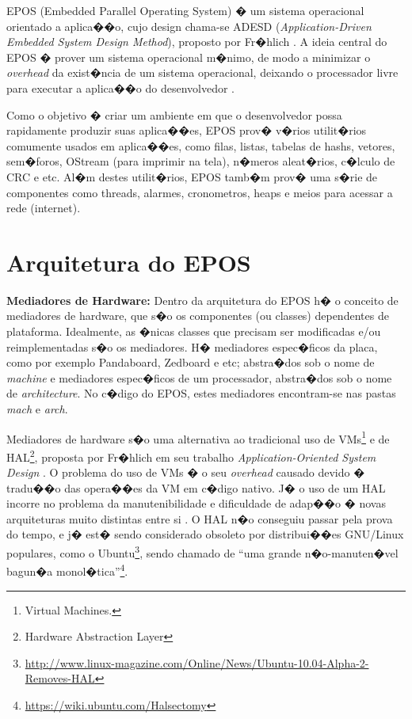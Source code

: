 \documentclass{ufscThesis/ufscThesis} %
\begin{document}
EPOS (Embedded Parallel Operating System) � um sistema operacional orientado a aplica��o, cujo design chama-se ADESD (\emph{Application-Driven Embedded System Design Method}), proposto por Fr�hlich \cite{guto_thesis}. A ideia central do EPOS � prover um sistema operacional m�nimo, de modo a minimizar o \emph{overhead} da exist�ncia de um sistema operacional, deixando o processador livre para executar a aplica��o do desenvolvedor \cite{epos_user_guide}.

Como o objetivo � criar um ambiente em que o desenvolvedor possa rapidamente produzir suas aplica��es, EPOS prov� v�rios utilit�rios comumente usados em aplica��es, como filas, listas, tabelas de hashs, vetores, sem�foros, OStream (para imprimir na tela), n�meros aleat�rios, c�lculo de CRC e etc. Al�m destes utilit�rios, EPOS tamb�m prov� uma s�rie de componentes como threads, alarmes, cronometros, heaps e meios para acessar a rede (internet).

\section{Arquitetura do EPOS}

\textbf{Mediadores de Hardware:} Dentro da arquitetura do EPOS h� o conceito de mediadores de hardware, que s�o os componentes (ou classes) dependentes de plataforma. Idealmente, as �nicas classes que precisam ser modificadas e/ou reimplementadas s�o os mediadores. H� mediadores espec�ficos da placa, como por exemplo Pandaboard, Zedboard e etc; abstra�dos sob o nome de \emph{machine} e mediadores espec�ficos de um processador, abstra�dos sob o nome de \emph{architecture}. No c�digo do EPOS, estes mediadores encontram-se nas pastas \emph{mach} e \emph{arch}.

Mediadores de hardware s�o uma alternativa ao tradicional uso de VMs\footnote{Virtual Machines.} e de HAL\footnote{Hardware Abstraction Layer}, proposta por Fr�hlich em seu trabalho \emph{Application-Oriented System Design} \cite{guto_thesis}. O problema do uso de VMs � o seu \emph{overhead} causado devido � tradu��o das opera��es da VM em c�digo nativo. J� o uso de um HAL incorre no problema da manutenibilidade e dificuldade de adap��o � novas arquiteturas muito distintas entre si \cite{hw_mediators}. O HAL n�o conseguiu passar pela prova do tempo, e j� est� sendo considerado obsoleto por distribui��es GNU/Linux populares, como o 
Ubuntu\footnote{\url{http://www.linux-magazine.com/Online/News/Ubuntu-10.04-Alpha-2-Removes-HAL}}, sendo chamado de ``uma grande n�o-manuten�vel bagun�a monol�tica''\footnote{\url{https://wiki.ubuntu.com/Halsectomy}}.
\end{document}
